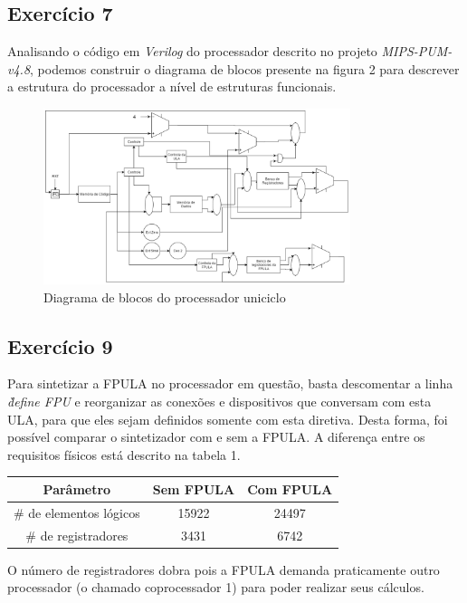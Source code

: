 \documentclass[12pt, a4paper, twoside]{article}
\begin{document}
\subsection{Exercício 7}

Analisando o código em \textit{Verilog} do processador descrito no projeto \textit{MIPS-PUM-v4.8}, podemos construir o diagrama de blocos presente na figura 2 para descrever a estrutura do processador a nível de estruturas funcionais.

\begin{figure}
    \centering
    \includegraphics[width=0.8\textwidth]{./figs/UNICICLO.png}
    \caption{Diagrama de blocos do processador uniciclo}
\end{figure}

\subsection{Exercício 9}

Para sintetizar a FPULA no processador em questão, basta descomentar a linha \textit{\` define FPU} e reorganizar as conexões e dispositivos que conversam com esta ULA, para que eles sejam definidos somente com esta diretiva. Desta forma, foi possível comparar o sintetizador com e sem a FPULA. A diferença entre os requisitos físicos está descrito na tabela 1.

\begin{center}
  \begin{tabular}{ | c | c | c | }
    \hline
    Parâmetro                  & Sem FPULA & Com FPULA \\ \hline \hline
    \# de elementos lógicos    & 15922     & 24497     \\ \hline
    \# de registradores        & 3431      & 6742      \\ \hline
  \end{tabular}
\end{center}

O número de registradores dobra pois a FPULA demanda praticamente outro processador (o chamado coprocessador 1) para poder realizar seus cálculos.
\end{document}
